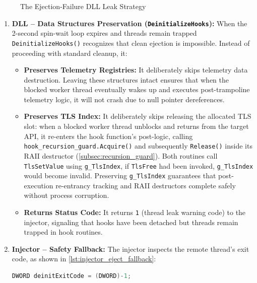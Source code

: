\begin{figure}[H]
	\caption{The Ejection-Failure \ac{DLL} Leak Strategy}
	\label{fig:leak_strategy_decision_tree}
\end{figure}

\begin{enumerate}
	\item \textbf{DLL -- Data Structures Preservation (\texttt{DeinitializeHooks}):}
	When the 2-second spin-wait loop expires and threads remain trapped \texttt{DeinitializeHooks()} recognizes that clean ejection is impossible.
	Instead of proceeding with standard cleanup, it:
	\begin{itemize}
		\item \textbf{Preserves Telemetry Registries:} It deliberately skips telemetry data destruction.
		Leaving these structures intact ensures that when the blocked worker thread eventually wakes up and executes post-trampoline telemetry logic, it will not crash due to null pointer dereferences.
		\item \textbf{Preserves TLS Index:} It deliberately skips releasing the allocated TLS slot: when a blocked worker thread unblocks and returns from the target API, it re-enters the hook function's post-logic, calling \texttt{hook\_recursion\_guard.Acquire()} and subsequently \texttt{Release()} inside its RAII destructor (\cref{subsec:recursion_guard}).
		Both routines call \texttt{TlsSetValue} using \texttt{g\_TlsIndex}, if \texttt{TlsFree} had been invoked, \texttt{g\_TlsIndex} would become invalid.
		Preserving \texttt{g\_TlsIndex} guarantees that post-execution re-entrancy tracking and RAII destructors complete safely without process corruption.
		\item \textbf{Returns Status Code:} It returns \texttt{1} (thread leak warning code) to the injector, signaling that hooks have been detached but threads remain trapped in hook routines.
	\end{itemize}

	\item \textbf{Injector -- Safety Fallback:}
	The injector inspects the remote thread's exit code, as shown in \cref{lst:injector_eject_fallback}:
	\begin{lstlisting}[language=C++, caption={Injector fallback logic in \texttt{injector.cpp}.}, label={lst:injector_eject_fallback}, basicstyle=\ttfamily\footnotesize, breaklines=true]
DWORD deinitExitCode = (DWORD)-1;


\end{lstlisting}
\end{enumerate}
